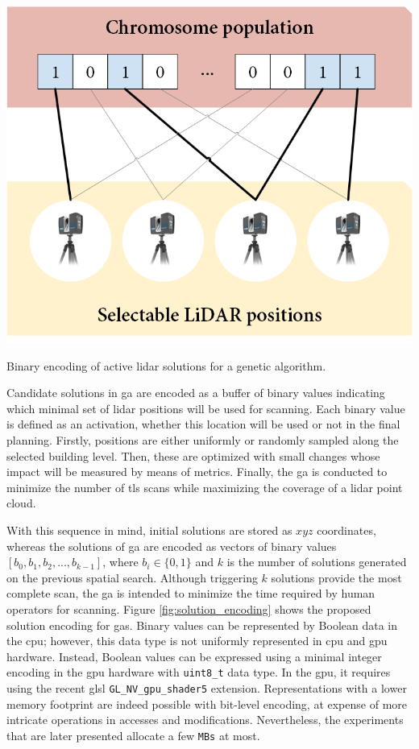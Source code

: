 \begin{marginfigure}[.2cm]
    \centering
    \includegraphics[width=\linewidth]{figs/lidar_optimization/solution_encoding.png}
	\caption{Binary encoding of active \acrshort{lidar} solutions for a genetic algorithm.}
	\label{fig:solution_encoding}
\end{marginfigure}
Candidate solutions in \acrshort{ga} are encoded as a buffer of binary values indicating which minimal set of \acrshort{lidar} positions will be used for scanning. Each binary value is defined as an activation, whether this location will be used or not in the final planning. Firstly, positions are either uniformly or randomly sampled along the selected building level. Then, these are optimized with small changes whose impact will be measured by means of metrics. Finally, the \acrshort{ga} is conducted to minimize the number of \acrshort{tls} scans while maximizing the coverage of a \acrshort{lidar} point cloud.

With this sequence in mind, initial solutions are stored as $xyz$ coordinates, whereas the solutions of \acrshort{ga} are encoded as vectors of binary values $[b_0, b_1, b_2, ..., b_{k-1}]$, where $b_i \in \{0, 1\}$ and $k$ is the number of solutions generated on the previous spatial search. Although triggering $k$ solutions provide the most complete scan, the \acrshort{ga} is intended to minimize the time required by human operators for scanning. Figure \ref{fig:solution_encoding} shows the proposed solution encoding for \acrshort{ga}s. Binary values can be represented by Boolean data in the \acrshort{cpu}; however, this data type is not uniformly represented in \acrshort{cpu} and \acrshort{gpu} hardware. Instead, Boolean values can be expressed using a minimal integer encoding in the \acrshort{gpu} hardware with \verb|uint8_t| data type. In the \acrshort{gpu}, it requires using the recent \acrshort{glsl} \verb|GL_NV_gpu_shader5| extension. Representations with a lower memory footprint are indeed possible with bit-level encoding, at expense of more intricate operations in accesses and modifications. Nevertheless, the experiments that are later presented allocate a few \verb|MBs| at most.

